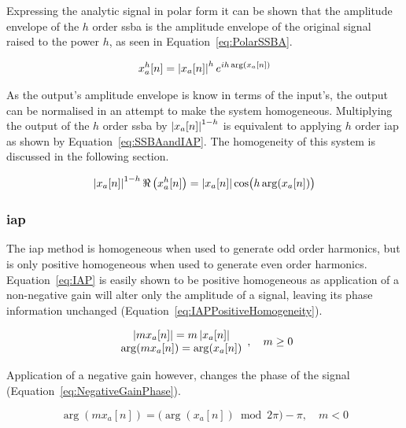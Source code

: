 			Expressing the analytic signal in polar form it can be shown that the amplitude envelope of the
			$h$ order \acrshort{ssba} is the amplitude envelope of the original signal raised to the
			power $h$, as seen in Equation~\ref{eq:PolarSSBA}.

			\begin{gather}
				x_{a}^{h}[n] = \left|x_{a}[n]\right|^{h} e^{ih\arg (x_{a}[n])}
				\label{eq:PolarSSBA}
			\end{gather}

			As the output's amplitude envelope is know in terms of the input's, the output can be normalised in
			an attempt to make the system homogeneous. Multiplying the output of the $h$ order
			\acrshort{ssba} by $\left|x_{a}[n]\right|^{1-h}$ is equivalent to applying $h$ order
			\acrshort{iap} as shown by Equation~\ref{eq:SSBAandIAP}. The homogeneity of this system is
			discussed in the following section.

			\begin{equation}
				\left|x_{a}[n]\right|^{1-h} \Re \left( x_{a}^{h}[n] \right) = 
				\left|x_{a}[n]\right| \cos \bigl( h\arg(x_{a}[n]) \bigr)
				\label{eq:SSBAandIAP}
			\end{equation}

		\subsubsection*{\acrshort{iap}}
			The \acrshort{iap} method is homogeneous when used to generate odd order harmonics, but is only
			positive homogeneous when used to generate even order harmonics. Equation~\ref{eq:IAP} is easily
			shown to be positive homogeneous as application of a non-negative gain will alter only the
			amplitude of a signal, leaving its phase information unchanged
			(Equation~\ref{eq:IAPPositiveHomogeneity}).

			\begin{equation}
				\begin{array}{c}
					\left|mx_{a}[n]\right| = m\left|x_{a}[n]\right| \\
					\arg(mx_{a}[n]) = \arg(x_{a}[n])
				\end{array}
				, \quad m \geq 0
				\label{eq:IAPPositiveHomogeneity}
			\end{equation}

			Application of a negative gain however, changes the phase of the signal
			(Equation~\ref{eq:NegativeGainPhase}).
						
			\begin{equation}
				\arg(mx_{a}[n]) = \bigl( \arg(x_{a}[n]) \bmod 2\pi \bigr) - \pi, \quad m < 0
				\label{eq:NegativeGainPhase}
			\end{equation}

